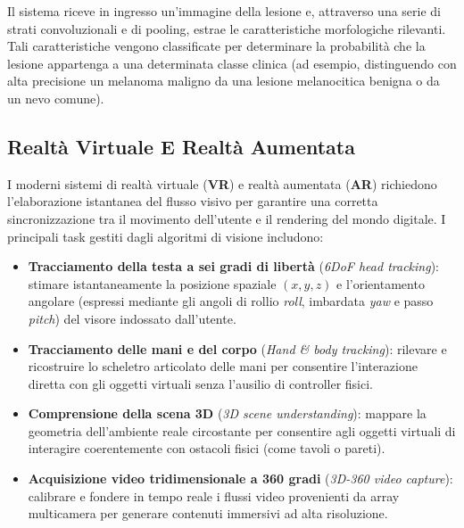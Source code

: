 ﻿\documentclass[11pt, a4paper]{article}
\begin{document}
Il sistema riceve in ingresso un'immagine della lesione e, attraverso una serie di strati convoluzionali e di pooling, estrae le caratteristiche morfologiche rilevanti. Tali caratteristiche vengono classificate per determinare la probabilità che la lesione appartenga a una determinata classe clinica (ad esempio, distinguendo con alta precisione un melanoma maligno da una lesione melanocitica benigna o da un nevo comune).

\subsection{Realtà Virtuale E Realtà Aumentata}

I moderni sistemi di realtà virtuale (\textbf{VR}) e realtà aumentata (\textbf{AR}) richiedono l'elaborazione istantanea del flusso visivo per garantire una corretta sincronizzazione tra il movimento dell'utente e il rendering del mondo digitale. I principali task gestiti dagli algoritmi di visione includono:
\begin{itemize}[noitemsep]
    \item \textbf{Tracciamento della testa a sei gradi di libertà} (\emph{6DoF head tracking}): stimare istantaneamente la posizione spaziale $(x, y, z)$ e l'orientamento angolare (espressi mediante gli angoli di rollio \emph{roll}, imbardata \emph{yaw} e passo \emph{pitch}) del visore indossato dall'utente.
    \item \textbf{Tracciamento delle mani e del corpo} (\emph{Hand \& body tracking}): rilevare e ricostruire lo scheletro articolato delle mani per consentire l'interazione diretta con gli oggetti virtuali senza l'ausilio di controller fisici.
    \item \textbf{Comprensione della scena 3D} (\emph{3D scene understanding}): mappare la geometria dell'ambiente reale circostante per consentire agli oggetti virtuali di interagire coerentemente con ostacoli fisici (come tavoli o pareti).
    \item \textbf{Acquisizione video tridimensionale a 360 gradi} (\emph{3D-360 video capture}): calibrare e fondere in tempo reale i flussi video provenienti da array multicamera per generare contenuti immersivi ad alta risoluzione.
\end{itemize}

\end{document}
